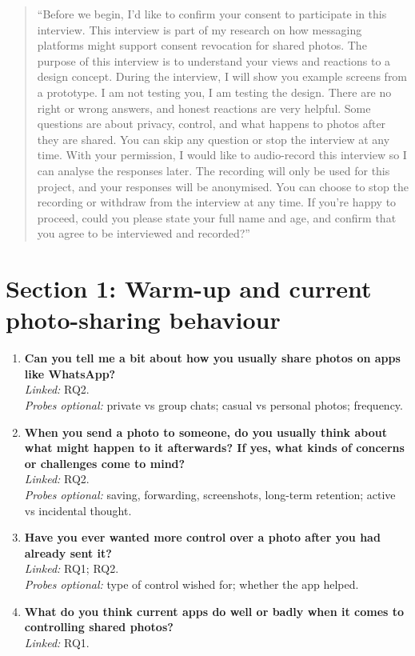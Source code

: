 \begin{quote}\small\sloppy
``Before we begin, I'd like to confirm your consent to participate in this interview. This interview is part of my research on how messaging platforms might support consent revocation for shared photos. The purpose of this interview is to understand your views and reactions to a design concept. During the interview, I will show you example screens from a prototype. I am not testing you, I am testing the design. There are no right or wrong answers, and honest reactions are very helpful. Some questions are about privacy, control, and what happens to photos after they are shared. You can skip any question or stop the interview at any time. With your permission, I would like to audio-record this interview so I can analyse the responses later. The recording will only be used for this project, and your responses will be anonymised. You can choose to stop the recording or withdraw from the interview at any time. If you're happy to proceed, could you please state your full name and age, and confirm that you agree to be interviewed and recorded?''
\end{quote}

\section{Section 1: Warm-up and current photo-sharing behaviour}


\begin{enumerate}
  \item \textbf{Can you tell me a bit about how you usually share photos on apps like WhatsApp?}\\
  \textit{Linked:} RQ2.\\
  \textit{Probes optional:} private vs group chats; casual vs personal photos; frequency.

  \item \textbf{When you send a photo to someone, do you usually think about what might happen to it afterwards? If yes, what kinds of concerns or challenges come to mind?}\\
  \textit{Linked:} RQ2.\\
  \textit{Probes optional:} saving, forwarding, screenshots, long-term retention; active vs incidental thought.

  \item \textbf{Have you ever wanted more control over a photo after you had already sent it?}\\
  \textit{Linked:} RQ1; RQ2.\\
  \textit{Probes optional:} type of control wished for; whether the app helped.

  \item \textbf{What do you think current apps do well or badly when it comes to controlling shared photos?}\\
  \textit{Linked:} RQ1.
\end{enumerate}
 

